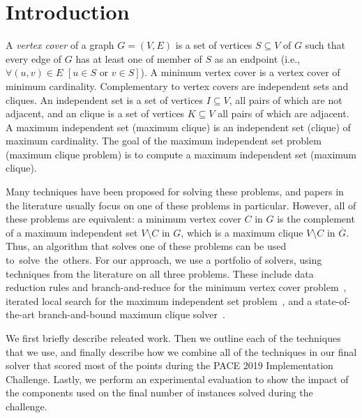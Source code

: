 \documentclass[twoside,leqno,twocolumn]{article}
\begin{document}
\section{Introduction}

A \emph{vertex cover} of a graph $G=(V,E)$ is a set of vertices $S\subseteq V$ of $G$ such that every edge of $G$ has at least one of member of $S$ as an endpoint (i.e., $\forall (u,v) \in E\,\, [u\in S \textrm{ or } v \in S]$).
A minimum vertex cover is a vertex cover of minimum cardinality. 
Complementary to vertex covers are independent sets and cliques. An independent set is a set of vertices $I\subseteq V$, all pairs of which are not adjacent, and an clique is a set of vertices $K\subseteq V$ all pairs of which are adjacent. A maximum independent set (maximum clique) is an independent set (clique) of maximum cardinality. The goal of the maximum independent set problem (maximum clique problem) is to compute a maximum independent set (maximum clique).

Many techniques have been proposed for solving these problems, and papers in the literature usually focus on one of these problems in particular. However, all of these problems are equivalent: a
minimum vertex cover $C$ in $G$ is the complement of a maximum independent set $V\setminus C$ in $G$, which is a maximum clique $V\setminus C$ in $\overline{G}$. Thus, an algorithm that solves one of these problems can be used to~solve~the~others.
For our approach, we use a portfolio of solvers, using techniques from the literature on all three problems. These include data reduction rules and branch-and-reduce for the minimum vertex cover problem~\cite{akiba-tcs-2016}, iterated local search for the maximum independent set problem~\cite{andrade-2012}, and a state-of-the-art branch-and-bound maximum clique solver~\cite{DBLP:journals/cor/LiJM17}.

We first briefly describe releated work. Then we outline each of the techniques that we use, and finally describe how we combine all of the techniques in our final solver that scored most of the points during the PACE 2019 Implementation Challenge. Lastly, we perform an experimental evaluation to show the impact of the components used on the final number of instances solved during the challenge.
\end{document}
